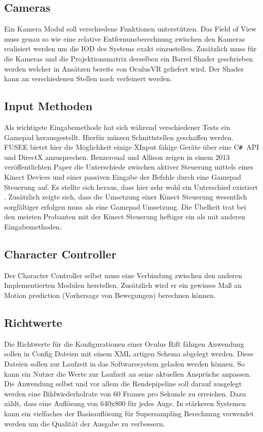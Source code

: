 \documentclass[pagesize, paper=a4, fontsize=12pt,titlepage=true, headings=small, headnosepline, abstractoff, liststotoc, nochapterprefix, plainheadsepline]{scrreprt}
\newcommand{\CSS}{C\texttt{\# }}
\begin{document}
\subsection{Cameras}
Ein Kamera Modul soll verschiedene Funktionen unterstützen. Das Field of View muss genau  so wie eine relative Entfernunsberechnung zwischen den Kameras realisiert werden um die IOD des Systems exakt einzustellen. Zusätzlich muss für die Kameras und die Projektionsmatrix derselben ein Barrel Shader geschrieben werden welcher in Ansätzen bereits von OculusVR geliefert wird. Der Shader kann an verschiedenen Stellen noch verfeinert werden.
\subsection{Input Methoden}
Als wichtigste Eingabemethode hat sich während verschiedener Tests ein Gamepad herausgestellt. Hierfür müssen Schnittstellen geschaffen werden. FUSEE bietet hier die Möglichkeit einige XInput fähige Geräte über eine \CSS API und DirectX anzusprechen. Benzeroual und Allison zeigen in einem 2013 veröffentlichten Paper die Unterschiede zwischen aktiver Steuerung mittels eines Kinect Devices und einer passiven Eingabe der Befehle durch eine Gamepad Steuerung auf. Es stellte sich heraus, dass  hier sehr wohl ein Unterschied existiert \cite{BenzAllison2013}. Zusätzlich zeigte sich, dass die Umsetzung einer Kinect Steuerung wesentlich sorgfältiger erfolgen muss als eine Gamepad Umsetzung. Die Übelkeit trat bei den meisten Probanten mit der Kinect Steuerung heftiger ein als mit anderen Eingabemethoden.
\subsection{Character Controller}
Der Character Controller selbst muss eine Verbindung zwischen den anderen Implementierten Modulen herstellen. Zusätzlich wird er ein gewisses Maß an Motion prediction (Vorhersage von Bewegungen) berechnen können.
\subsection{Richtwerte}
Die Richtwerte für die Konfigurationen einer Oculus Rift fähigen Anwendung sollen in Config Dateien mit einem XML artigen Schema abgelegt werden. Diese Dateien sollen zur Laufzeit in das Softwaresystem geladen werden können. So kann ein Nutzer die Werte zur Laufzeit an seine aktuellen Ansprüche anpassen. Die Anwendung selbst und vor allem die Rendepipeline soll darauf ausgelegt werden eine Bildwiederholrate von 60 Frames pro Sekunde zu erreichen. Dazu zählt, dass eine Auflösung von 640x800 für jedes Auge. In stärkeren Systemen kann ein vielfaches der Basisauflösung für Supersampling Berechnung verwendet werden um die Qualität der Ausgabe zu verbessern.
\end{document}
